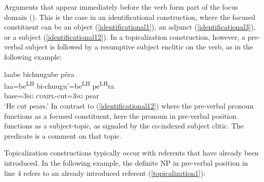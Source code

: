 Arguments that appear immediately before the verb form part of the focus domain (). This is the case in an identificational construction, where the focused constituent can be an object (\ref{identificational1}), an adjunct (\ref{identificational3}), or a subject (\ref{identificational12}). In a topicalization construction, however, a pre-verbal subject is followed by a resumptive subject enclitic on the verb, as in the following example:

\ea\label{topicalization}
\glll laabe b\'{i}chuugube p\v{e}ra  \\
laa=be\textsuperscript{LH} bi-chuugu'=be\textsuperscript{LH} pe\textsuperscript{LH}ra  \\
base=\textsc{3sg} \textsc{compl}-cut=\textsc{3sg} pear  \\
\glt `He cut pears.' 
\z
In contrast to (\ref{identificational12}) where the pre-verbal pronoun functions as a focused constituent, here the pronoun in pre-verbal position functions as a subject-topic, as signaled by the co-indexed subject clitic. The predicate is a comment on that topic. 

Topicalization constructions typically occur with referents that have already been introduced. In the following example, the definite NP in pre-verbal position in line 4 refers to an already introduced referent (\ref{topicalization1}):

